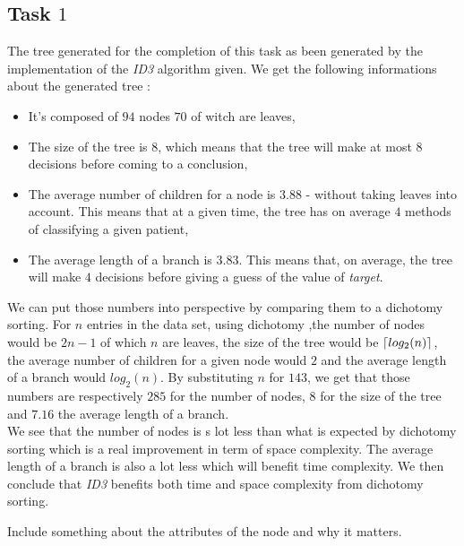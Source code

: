 \documentclass[french]{article}
\DeclarePairedDelimiter\ceil{\lceil}{\rceil}
\begin{document}
\subsection{Task $1$}
	The tree generated for the completion of this task as been generated by the implementation of the \emph{ID3} algorithm given. We get the following informations about the generated tree :
	\begin{itemize}
		\item It's composed of $94$ nodes $70$ of witch are leaves,
		\item The size of the tree is 8, which means that the tree will make at most $8$ decisions before coming to a conclusion,
		\item The average number of children for a node is $3.88$ - without taking leaves into account. This means that at a given time, the tree has on average $4$ methods of classifying a given patient,
		\item The average length of a branch is $3.83$.  This means that, on average, the tree will make $4$ decisions before giving a guess of the value of \emph{target}.
	\end{itemize}
	We can put those numbers into perspective by comparing them to a dichotomy sorting. For $n$ entries in the data set, using dichotomy ,the number of nodes would be $2n-1$ of which $n$ are leaves, the size of the tree would be $\ceil*{log_2(n)}$, the average number of children for a given node would $2$ and the average length of a branch would $log_2(n)$. By substituting $n$ for $143$, we get that those numbers are respectively $285$ for the number of nodes, $8$ for the size of the tree and $7.16$ the average length of a branch.\\
	We see that the number of nodes is s lot less than what is expected by dichotomy sorting which is a real improvement in term of space complexity. The average length of a branch is also a lot less which will benefit time complexity. We then conclude that \emph{ID3} benefits both time and space complexity from dichotomy sorting.
		
		
		Include something about the attributes of the node and why it matters.
		
\end{document}
